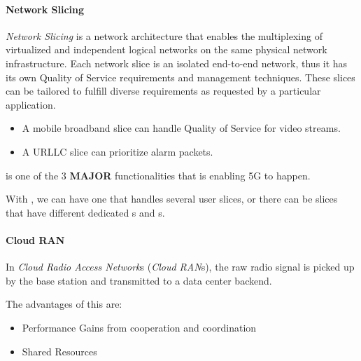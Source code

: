 \paragraph{Network Slicing}\label{par:Network_Slicing}
\begin{definition}\label{def:Network_Slicing}
  \emph{Network Slicing} is a network architecture that enables the multiplexing of virtualized and independent logical networks on the same physical network infrastructure.
  Each network slice is an isolated end-to-end network, thus it has its own Quality of Service requirements and management techniques.
  These slices can be tailored to fulfill diverse requirements as requested by a particular application.
  \begin{itemize}[noitemsep]
  \item A mobile broadband slice can handle Quality of Service for video streams.
  \item A URLLC slice can prioritize alarm packets.
  \end{itemize}

  \begin{remark}\label{rmk:Network_Slicing_Core_5G}
     is one of the 3 \textbf{MAJOR} functionalities that is enabling 5G to happen.
  \end{remark}
\end{definition}

With , we can have one  that handles several user slices, or there can be slices that have different dedicated s and s.

\paragraph{Cloud RAN}\label{par:Cloud_RAN}
\begin{definition}\label{def:Cloud_RAN}
  In \emph{Cloud Radio Access Network}s (\emph{Cloud RAN}s), the raw radio signal is picked up by the base station and transmitted to a data center backend.
\end{definition}

The advantages of this are:
\begin{itemize}[noitemsep]
\item Performance Gains from cooperation and coordination
\item Shared Resources
\end{itemize}

